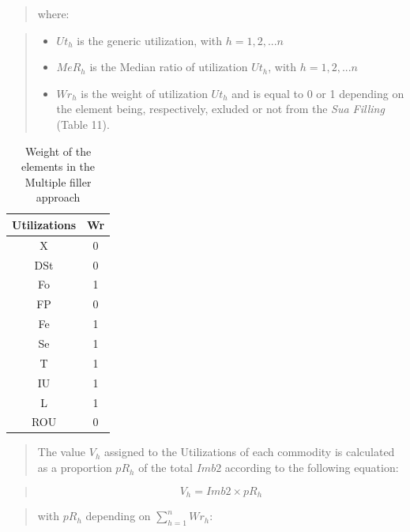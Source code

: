 \documentclass[]{article}
\providecommand{\tightlist}{%
  \setlength{\itemsep}{0pt}\setlength{\parskip}{0pt}}
\begin{document}
\begin{quote}
where:
\end{quote}

\begin{quote}
\begin{itemize}
\tightlist
\item
  \(Ut_{h}\) is the generic utilization, with \(h=1,2,...n\)
\item
  \(MeR_{h}\) is the Median ratio of utilization \(Ut_{h}\), with
  \(h=1,2,...n\)
\item
  \(Wr_{h}\) is the weight of utilization \(Ut_{h}\) and is equal to 0
  or 1 depending on the element being, respectively, exluded or not from
  the \emph{Sua Filling} (Table 11).
\end{itemize}
\end{quote}

\begin{table}

\caption{\label{tab:t10}Weight of the elements in the Multiple filler approach}
\centering
\begin{tabular}[t]{c|c}
\hline
Utilizations & Wr\\
\hline
X & 0\\
\hline
DSt & 0\\
\hline
Fo & 1\\
\hline
FP & 0\\
\hline
Fe & 1\\
\hline
Se & 1\\
\hline
T & 1\\
\hline
IU & 1\\
\hline
L & 1\\
\hline
ROU & 0\\
\hline
\end{tabular}
\end{table}

\begin{quote}
The value \(V_{h}\) assigned to the Utilizations of each commodity is
calculated as a proportion \(pR_{h}\) of the total \(Imb2\) according to
the following equation:
\end{quote}

\begin{quote}
\begin{equation}
\label{eq:inverseRank}
V_{h} = Imb2 \times pR_{h}
\end{equation}
\end{quote}

\begin{quote}
with \(pR_{h}\) depending on \(\sum \limits_{h=1}^n Wr_{h}\):
\end{quote}
\end{document}

